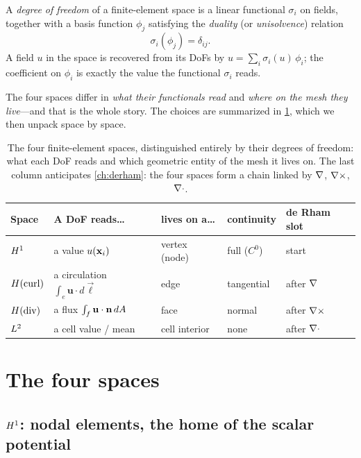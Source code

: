 \begin{definition}
A \emph{degree of freedom} of a finite-element space is a linear functional
$\sigma_i$ on fields, together with a basis function $\phi_j$ satisfying the
\emph{duality} (or \emph{unisolvence}) relation
\[
  \sigma_i(\phi_j) = \delta_{ij}.
\]
A field $u$ in the space is recovered from its DoFs by
$u = \sum_i \sigma_i(u)\,\phi_i$; the coefficient on $\phi_i$ is exactly the value
the functional $\sigma_i$ reads.
\end{definition}

The four spaces differ in \emph{what their functionals read} and \emph{where on the
mesh they live}---and that is the whole story. The choices are summarized in
\cref{tab:fourdofs}, which we then unpack space by space.

\begin{table}[t]
\centering
\caption[Degrees of freedom of the four spaces]{The four finite-element spaces,
distinguished entirely by their degrees of freedom: what each DoF reads and which
geometric entity of the mesh it lives on. The last column anticipates
\cref{ch:derham}: the four spaces form a chain linked by $\nabla$, $\nabla\times$, $\nabla\cdot$.}
\label{tab:fourdofs}
\small
\setlength{\tabcolsep}{5pt}
\renewcommand{\arraystretch}{1.3}
\begin{tabular}{@{}lllll@{}}
\toprule
Space & A DoF reads\dots & lives on a\dots & continuity & de Rham slot \\
\midrule
$H^1$ & a value $u(\mathbf{x}_i)$ & vertex (node) & full ($C^0$) & start \\
$H(\mathrm{curl})$ & a circulation $\int_e \mathbf{u}\cdot d\vec\ell$ & edge & tangential & after $\nabla$ \\
$H(\mathrm{div})$ & a flux $\int_f \mathbf{u}\cdot\mathbf{n}\,dA$ & face & normal & after $\nabla\times$ \\
$L^2$ & a cell value / mean & cell interior & none & after $\nabla\cdot$ \\
\bottomrule
\end{tabular}
\end{table}

\section{The four spaces}

\subsection{$H^1$: nodal elements, the home of the scalar potential}

